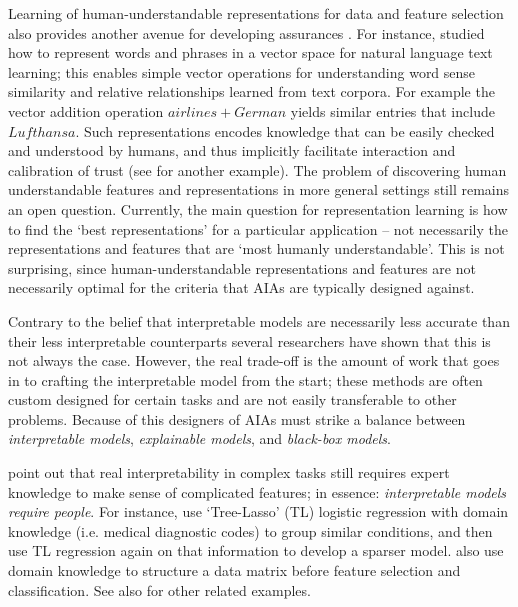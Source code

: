 Learning of human-understandable representations for data and feature selection also provides another avenue for developing assurances  \cite{Bengio2013-uv, Guyon2003-fj}. For instance, \citet{Mikolov2013-lt} studied how to represent words and phrases in a vector space for natural language text learning; this enables simple vector operations for understanding word sense similarity and relative relationships learned from text corpora. For example the vector addition operation $airlines+German$ yields similar entries that include $Lufthansa$. Such representations encodes knowledge that can be easily checked and understood by humans, and thus implicitly facilitate interaction and calibration of trust (see \cite{Haury2011-zi} for another example). The problem of discovering human understandable features and representations in more general settings still remains an open question. Currently, the main question for representation learning is how to find the `best representations' for a particular application -- not necessarily the representations and features that are `most humanly understandable'. This is not surprising, since human-understandable representations and features are not necessarily optimal for the criteria that AIAs are typically designed against. 

Contrary to the belief that interpretable models are necessarily less accurate  than their less interpretable counterparts several researchers have shown that this is not always the case. However, the real trade-off is the amount of work that goes in to crafting the interpretable model from the start; these methods are often custom designed for certain tasks and are not easily transferable to other problems. Because of this designers of AIAs must strike a balance between \emph{interpretable models}, \emph{explainable models}, and \emph{black-box models}.

\citet{Park2016-ld} point out that real interpretability in complex tasks still requires expert knowledge to make sense of complicated features; in essence: \emph{interpretable models require people}. For instance, \citet{Jovanovic2016-gw} use `Tree-Lasso' (TL) logistic regression with domain knowledge (i.e. medical diagnostic codes) to group similar conditions, and then use TL regression again on that information to develop a sparser model. \citet{Zycinski2012-jj} also use domain knowledge to structure a data matrix before feature selection and classification. See also \citet{Zhang2018-no,Khoa2018-gh} for other related examples.

